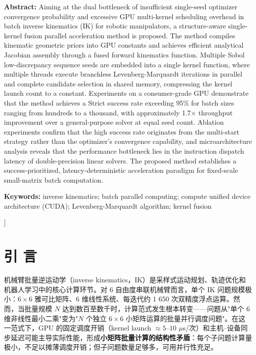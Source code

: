\documentclass[twocolumn,a4paper,10pt]{ctexart}
\begin{document}
{\begin{minipage}{0.91\textwidth}
{}
{\bfseries Abstract:} Aiming at the dual bottleneck of insufficient single-seed optimizer convergence probability and excessive GPU multi-kernel scheduling overhead in batch inverse kinematics (IK) for robotic manipulators, a structure-aware single-kernel fusion parallel acceleration method is proposed. The method compiles kinematic geometric priors into GPU constants and achieves efficient analytical Jacobian assembly through a fused forward kinematics function. Multiple Sobol low-discrepancy sequence seeds are embedded into a single kernel function, where multiple threads execute branchless Levenberg-Marquardt iterations in parallel and complete candidate selection in shared memory, compressing the kernel launch count to a constant. Experiments on a consumer-grade GPU demonstrate that the method achieves a Strict success rate exceeding 95\% for batch sizes ranging from hundreds to a thousand, with approximately 1.7$\times$ throughput improvement over a general-purpose solver at equal seed count. Ablation experiments confirm that the high success rate originates from the multi-start strategy rather than the optimizer's convergence capability, and microarchitecture analysis reveals that the performance bottleneck lies in the instruction dispatch latency of double-precision linear solvers. The proposed method establishes a success-prioritized, latency-deterministic acceleration paradigm for fixed-scale small-matrix batch computation.\par\vspace{2mm}
{\bfseries Keywords:} inverse kinematics; batch parallel computing; compute unified device architecture (CUDA); Levenberg-Marquardt algorithm; kernel fusion\par
\end{minipage}\par
}]

\setcounter{section}{-1}
\section{引 言}

机械臂批量逆运动学（inverse kinematics，IK）是采样式运动规划、轨迹优化和机器人学习中的核心计算环节\cite{siciliano2010robotics,lavalle2006planning}。对 6 自由度串联机械臂而言，单个 IK 问题规模极小：$6\times6$ 雅可比矩阵、6 维线性系统、每迭代约 1 650 次双精度浮点运算。然而，当批量规模 $N$ 达到数百至数千时，计算范式发生根本转变——问题从"单个 6 维非线性最小二乘"变为"$N$ 个独立 $6\times6$ 小矩阵运算的批量并行调度问题"。在这一范式下，GPU 的固定调度开销（kernel launch $\approx5$--$10$ $\mu$s/次）和主机--设备同步延迟可能主导实际性能\cite{cuda}，形成\textbf{小矩阵批量计算的结构性矛盾}：每个子问题计算量极小，不足以摊薄调度开销；但子问题数量足够多，可用并行性充足。
\end{document}

